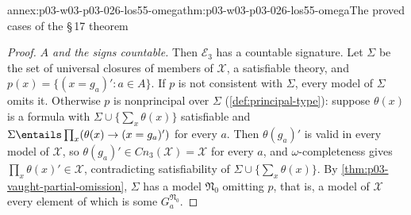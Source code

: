 \begin{annexitem}{annex:p03-w03-p03-026-los55-omega}{thm:p03-w03-p03-026-los55-omega}{The proved cases of the \S\,17 theorem}
\begin{proof}
\emph{\(A\) and the signs countable.}  Then \(\mathcal E_3\) has a countable
signature.  Let \(\Sigma\) be the set of universal closures of members of
\(\mathcal X\), a satisfiable theory, and
\(p(x)=\{(x=g_a)':a\in A\}\).  If \(p\) is not consistent with \(\Sigma\),
every model of \(\Sigma\) omits it.  Otherwise \(p\) is nonprincipal over
\(\Sigma\) (\cref{def:principal-type}): suppose \(\theta(x)\) is a formula with
\(\Sigma\cup\{\sum_x\theta(x)\}\) satisfiable and
\(\Sigma\entails\prod_x(\theta(x)\to(x=g_a)')\) for every \(a\).  Then
\(\theta(g_a)'\) is valid in every model of \(\mathcal X\), so
\(\theta(g_a)'\in\mathit{Cn}_3(\mathcal X)=\mathcal X\) for every \(a\), and
\(\omega\)-completeness gives \(\prod_x\theta(x)'\in\mathcal X\), contradicting
satisfiability of \(\Sigma\cup\{\sum_x\theta(x)\}\).  By
\cref{thm:p03-vaught-partial-omission}, \(\Sigma\) has a model
\(\mathfrak N_0\) omitting \(p\), that is, a model of \(\mathcal X\) every
element of which is some \(G_a^{\mathfrak N_0}\).
\end{proof}
\end{annexitem}
